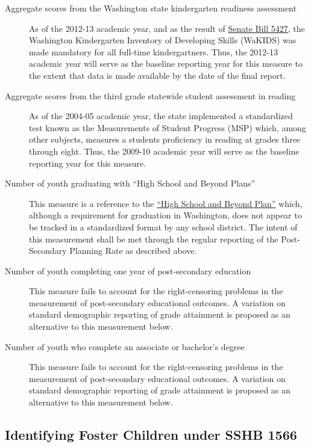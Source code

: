\documentclass[12pt]{article}\usepackage[]{graphicx}\usepackage[]{color}
\begin{document}
\begin{description}
  \item [Aggregate scores from the Washington state kindergarten readiness assessment] As of the 2012-13 academic year, and as the result of \href{http://apps.leg.wa.gov/billinfo/summary.aspx?bill=5427&year=2011}{Senate Bill 5427}, the Washington Kindergarten Inventory of Developing Skills (WaKIDS) was made mandatory for all full-time kindergartners. Thus, the 2012-13 academic year will serve as the baseline reporting year for this measure to the extent that data is made available by the date of the final report.
  \item [Aggregate scores from the third grade statewide student assessment in reading] As of the 2004-05 academic year, the state implemented a standardized test known as the Measurements of Student Progress (MSP) which, among other subjects, measures a students proficiency in reading at grades three through eight. Thus, the 2009-10 academic year will serve as the baseline reporting year for this measure. 
  \item [Number of youth graduating with ``High School and Beyond Plans''] This measure is a reference to the \href{http://apps.leg.wa.gov/billinfo/summary.aspx?bill=5427&year=2011}{``High School and Beyond Plan''} which, although a requirement for graduation in Washington, does not appear to be tracked in a standardized format by any school district. The intent of this measurement shall be met through the regular reporting of the Post-Secondary Planning Rate as described above. 
  \item [Number of youth completing one year of post-secondary education] This measure fails to account for the right-censoring problems in the measurement of post-secondary educational outcomes. A variation on standard demographic reporting of grade attainment is proposed as an alternative to this measurement below.
  \item [Number of youth who complete an associate or bachelor's degree] This measure fails to account for the right-censoring problems in the measurement of post-secondary educational outcomes. A variation on standard demographic reporting of grade attainment is proposed as an alternative to this measurement below.
\end{description}


\subsection{Identifying Foster Children under SSHB 1566}
\end{document}
